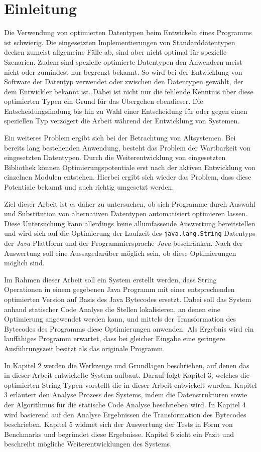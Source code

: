 \chapter{Einleitung}

Die Verwendung von optimierten Datentypen beim Entwickeln eines Programms ist schwierig.
Die eingesetzten Implementierungen von Standarddatentypen decken zumeist allgemeine 
Fälle ab, sind aber nicht optimal für spezielle Szenarien. Zudem sind spezielle
optimierte Datentypen den Anwendern meist nicht oder zumindest nur begrenzt bekannt.
So wird bei der Entwicklung von Software der Datentyp verwendet oder zwischen den 
Datentypen gewählt, der dem Entwickler bekannt ist. Dabei ist nicht nur die fehlende 
Kenntnis über diese optimierten Typen ein Grund für das Übergehen ebendieser. Die 
Entscheidungsfindung bis hin zu Wahl einer Entscheidung für oder gegen einen speziellen
Typ verzögert die Arbeit während der Entwicklung von Systemen. 

Ein weiteres Problem ergibt sich bei der Betrachtung von Altsystemen. Bei bereits 
lang bestehenden Anwendung, besteht das Problem der Wartbarkeit von eingesetzten Datentypen. 
Durch die Weiterentwicklung von eingesetzten Bibliothek können Optimierungspotentiale
erst nach der aktiven Entwicklung von einzelnen Modulen entstehen. Hierbei ergibt sich
wieder das Problem, dass diese Potentiale bekannt und auch richtig umgesetzt werden.

Ziel dieser Arbeit ist es daher zu untersuchen, ob sich Programme durch Auswahl und 
Substitution von alternativen Datentypen automatisiert optimieren lassen. Diese 
Untersuchung kann allerdings keine allumfassende Auswertung bereitstellen und wird 
sich auf die Optimierung der Laufzeit des \texttt{java.lang.String} Datentyps der 
\textit{Java} Plattform und der Programmiersprache \textit{Java} beschränken. Nach 
der Auswertung soll eine Aussagedarüber möglich sein, ob diese Optimierungen möglich sind.

Im Rahmen dieser Arbeit soll ein System erstellt werden, dass String Operationen in einem
gegebenen Java Programm mit einer entsprechenden optimierten Version auf Basis des 
Java Bytecodes ersetzt. Dabei soll das System anhand statischer Code Analyse die Stellen
lokalisieren, an denen eine Optimierung angewendet werden kann, und mittels der Transformation des 
Bytecodes des Programms diese Optimierungen anwenden. Als Ergebnis wird ein lauffähiges
Programm erwartet, dass bei gleicher Eingabe eine geringere Ausführungszeit besitzt 
als das originale Programm.

In Kapitel 2 werden die Werkzeuge und Grundlagen beschrieben, auf denen das in dieser Arbeit
entwickelte System aufbaut. Darauf folgt Kapitel 3, welches die optimierten String Typen vorstellt
die in dieser Arbeit entwickelt wurden. Kapitel 3 erläutert den Analyse Prozess des Systems, indem
die Datenstrukturen sowie der Algorithmus für die statische Code Analyse beschrieben wird.
In Kapitel 4 wird basierend auf den Analyse Ergebnissen die Transformation des Bytecodes 
beschrieben. Kapitel 5 widmet sich der Auswertung der Tests in Form von Benchmarks
und begründet diese Ergebnisse. Kapitel 6 zieht ein Fazit und beschreibt mögliche
Weiterentwicklungen des Systems.    